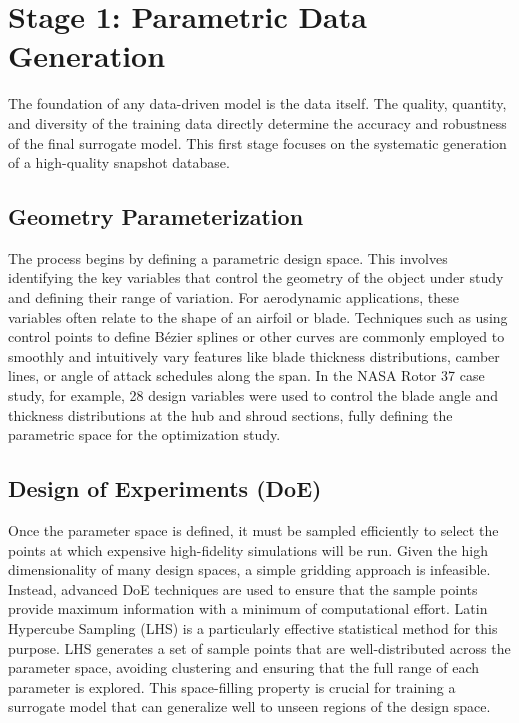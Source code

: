\documentclass[dsc, EN]{ufabcFHZh}
\begin{document}
\section{Stage 1: Parametric Data Generation}

The foundation of any data-driven model is the data itself. The quality, quantity, and diversity of the training data directly determine the accuracy and robustness of the final surrogate model. This first stage focuses on the systematic generation of a high-quality snapshot database.


\subsection{Geometry Parameterization}

The process begins by defining a parametric design space. This involves identifying the key variables that control the geometry of the object under study and defining their range of variation. For aerodynamic applications, these variables often relate to the shape of an airfoil or blade. Techniques such as using control points to define Bézier splines or other curves are commonly employed to smoothly and intuitively vary features like blade thickness distributions, camber lines, or angle of attack schedules along the span. In the NASA Rotor 37 case study, for example, 28 design variables were used to control the blade angle and thickness distributions at the hub and shroud sections, fully defining the parametric space for the optimization study.

\subsection{Design of Experiments (DoE)}

Once the parameter space is defined, it must be sampled efficiently to select the points at which expensive high-fidelity simulations will be run. Given the high dimensionality of many design spaces, a simple gridding approach is infeasible. Instead, advanced DoE techniques are used to ensure that the sample points provide maximum information with a minimum of computational effort. Latin Hypercube Sampling (LHS) is a particularly effective statistical method for this purpose. LHS generates a set of sample points that are well-distributed across the parameter space, avoiding clustering and ensuring that the full range of each parameter is explored. This space-filling property is crucial for training a surrogate model that can generalize well to unseen regions of the design space.
\end{document}
